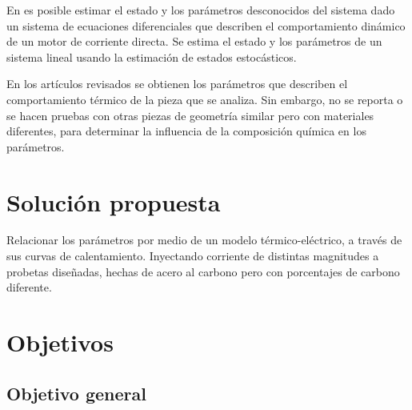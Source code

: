 En \cite{KalmanBucyPaz} es posible estimar el estado y los parámetros desconocidos del sistema dado un sistema de ecuaciones diferenciales que describen el comportamiento dinámico de un motor de corriente directa. 
Se estima el estado y los parámetros de un sistema lineal 
usando la estimación de estados estocásticos. 




En los artículos revisados se obtienen los parámetros que describen el comportamiento térmico de la pieza que se analiza. Sin embargo, no se reporta o se hacen pruebas con otras piezas de geometría similar pero con materiales diferentes, para determinar la influencia de la composición química en los parámetros.









\section{Solución propuesta} \label{SolProp}

\noindent Relacionar los parámetros por medio de un modelo
térmico-eléctrico, a través de sus curvas de calentamiento. Inyectando corriente de distintas magnitudes a probetas diseñadas, hechas de acero al carbono pero con porcentajes de carbono diferente.


\section{Objetivos}

\subsection{Objetivo general}

